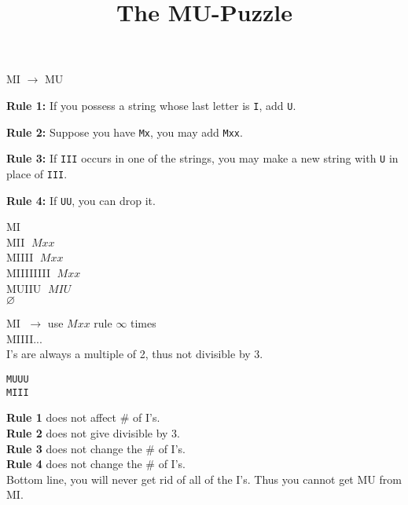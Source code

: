 \documentclass{article}
\title{The MU-Puzzle}
\date{}
\begin{document}
\maketitle

MI $\rightarrow$ MU

\textbf{Rule 1:} If you possess a string whose last letter is \texttt{I}, add \texttt{U}.

\textbf{Rule 2:} Suppose you have \texttt{Mx}, you may add \texttt{Mxx}.

\textbf{Rule 3:} If \texttt{III} occurs in one of the strings, you may make a new string with \texttt{U} in place of \texttt{III}.

\textbf{Rule 4:} If \texttt{UU}, you can drop it.

\vspace{1em}

MI \\
MII $\; Mxx$ \\
MIIII $\; Mxx$ \\
MIIIIIIII $\; Mxx$ \\
MUIIU $\; MIU$ \\
$\varnothing$

\vspace{1em}

MI $\; \rightarrow$ use $Mxx$ rule $\infty$ times \\
MIIII... \\

I's are always a multiple of 2, thus not divisible by 3.

\vspace{1em}

\texttt{MUUU} \\
\texttt{MIII}

\vspace{1em}

\textbf{Rule 1} does not affect \# of I's. \\
\textbf{Rule 2} does not give divisible by 3. \\
\textbf{Rule 3} does not change the \# of I's. \\
\textbf{Rule 4} does not change the \# of I's. \\

Bottom line, you will never get rid of all of the I's. Thus you cannot get MU from MI.
\end{document}
